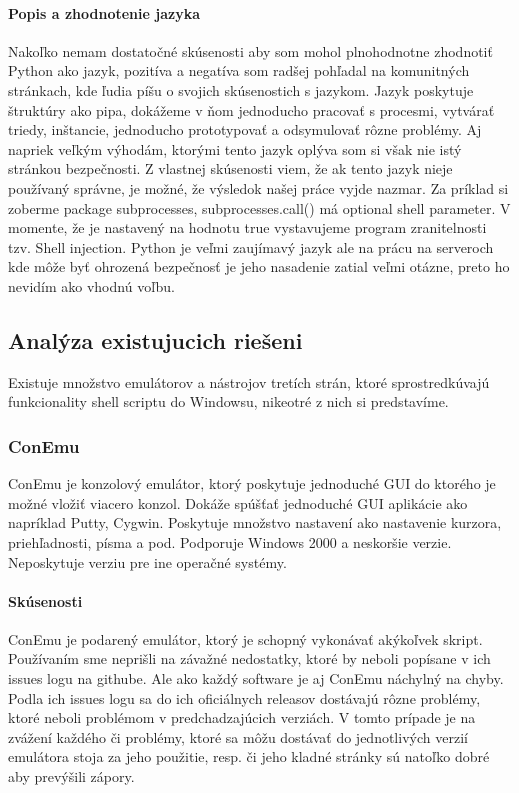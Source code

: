 \paragraph{Popis a zhodnotenie jazyka}
Nakoľko nemam dostatočné skúsenosti aby som mohol plnohodnotne zhodnotiť Python ako jazyk, pozitíva a negatíva som radšej pohľadal na komunitných stránkach, kde ľudia píšu o svojich skúsenostich s jazykom. Jazyk poskytuje štruktúry ako pipa, dokážeme v ňom jednoducho pracovať s procesmi, vytvárať triedy, inštancie, jednoducho prototypovať a odsymulovať rôzne problémy. Aj napriek veľkým výhodám, ktorými tento jazyk oplýva som si však nie istý stránkou bezpečnosti. Z vlastnej skúsenosti viem, že ak tento jazyk nieje používaný správne, je možné, že výsledok našej práce vyjde nazmar. Za príklad si zoberme  package subprocesses, subprocesses.call() má optional shell parameter. V momente, že je nastavený na hodnotu true vystavujeme program zranitelnosti tzv. Shell injection. Python je veľmi zaujímavý jazyk ale na prácu na serveroch kde môže byť ohrozená bezpečnosť je jeho nasadenie zatial veľmi otázne, preto ho nevidím ako vhodnú voľbu.

\subsection{Analýza existujucich riešeni}
\indent
Existuje množstvo emulátorov a nástrojov tretích strán, ktoré sprostredkúvajú funkcionality shell scriptu do Windowsu, nikeotré z nich si predstavíme.

\subsubsection{ConEmu}
\indent ConEmu je konzolový emulátor, ktorý poskytuje jednoduché GUI do ktorého je možné vložiť viacero konzol. Dokáže spúšťať jednoduché GUI aplikácie ako napríklad Putty, Cygwin. Poskytuje množstvo nastavení ako nastavenie kurzora, priehľadnosti, písma a pod. Podporuje Windows 2000 a neskoršie verzie. Neposkytuje verziu pre ine operačné systémy. 
\paragraph{Skúsenosti}
\indent ConEmu je podarený emulátor, ktorý je schopný vykonávať akýkoľvek skript. Používaním sme neprišli na závažné nedostatky, ktoré by neboli popísane v ich issues logu na githube. Ale ako každý software je aj ConEmu náchylný na chyby. Podla ich issues logu sa do ich oficiálnych releasov dostávajú rôzne problémy, ktoré neboli problémom v predchadzajúcich verziách. V tomto prípade je na zvážení každého či problémy, ktoré sa môžu dostávať do jednotlivých verzií emulátora stoja za jeho použitie, resp. či jeho kladné stránky sú natoľko dobré aby prevýšili zápory.

